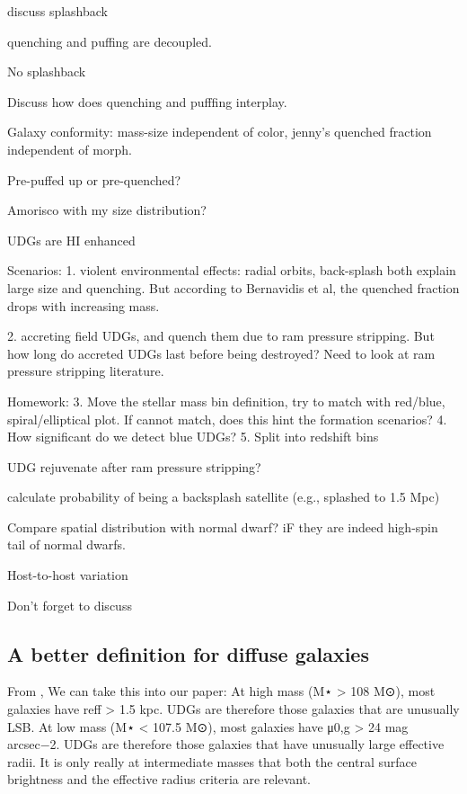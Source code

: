 \documentclass[twocolumn,astrosymb,twocolappendix]{aastex631}
\begin{document}
\begin{CJK*}{UTF8}{gbsn}



discuss splashback

quenching and puffing are decoupled. 

No splashback

Discuss how does quenching and pufffing interplay.

Galaxy conformity: mass-size independent of color, jenny's quenched fraction independent of morph. 

Pre-puffed up or pre-quenched?

Amorisco with my size distribution?


UDGs are HI enhanced \citep{Wright2021,Kado-Fong2021}

Scenarios:
1. violent environmental effects: radial orbits, back-splash both explain large size and quenching. But according to Bernavidis et al, the quenched fraction drops with increasing mass. 

2. accreting field UDGs, and quench them due to ram pressure stripping. But how long do accreted UDGs last before being destroyed? Need to look at ram pressure stripping literature.

Homework:
3. Move the stellar mass bin definition, try to match with red/blue, spiral/elliptical plot. If cannot match, does this hint the formation scenarios?
4. How significant do we detect blue UDGs? 
5. Split into redshift bins


UDG rejuvenate after ram pressure stripping?


calculate probability of being a backsplash satellite (e.g., splashed to 1.5 Mpc)

Compare spatial distribution with normal dwarf? iF they are indeed high-spin tail of normal dwarfs. 

Host-to-host variation

Don't forget to discuss \citep{xSAGA-I}


\subsection{A better definition for diffuse galaxies}



From \citet{Wright2021}, We can take this into our paper: At high mass (M⋆ > 108 M⊙), most galaxies have reff > 1.5 kpc. UDGs are therefore those galaxies that are unusually LSB. At low mass (M⋆ < 107.5 M⊙), most galaxies have μ0,g > 24 mag arcsec−2. UDGs are therefore those galaxies that have unusually large effective radii. It is only really at intermediate masses that both the central surface brightness and the effective radius criteria are relevant.


\end{CJK*}
\end{document}
